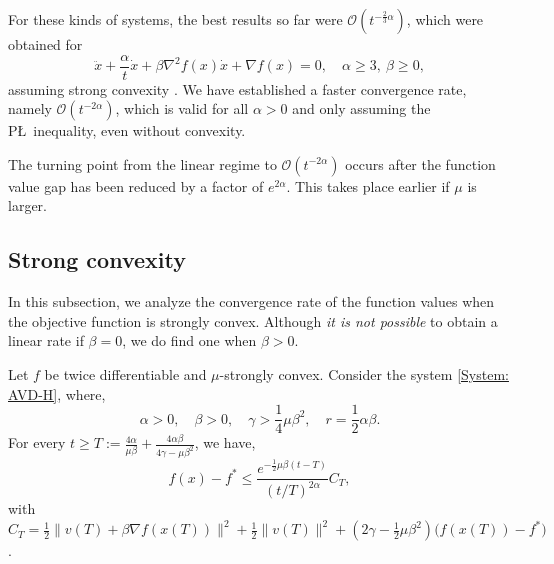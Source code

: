 \documentclass[onefignum,onetabnum]{siamart220329}
\begin{document}
\begin{remark}
For these kinds of systems, the best results so far were $\mathcal{O}\left( t^{-\frac{2}{3}\alpha} \right)$, which were obtained for 
$$ \ddot{x} + \frac{\alpha}{t}\dot{x} + \beta\nabla^2 f(x)\dot{x} + \nabla f(x) = 0,\quad\alpha\ge 3,\ \beta\ge  0,$$
assuming strong convexity \cite{Su_2016,Attouch_2016_Hessian,Attouch_2018}. We have established a faster convergence rate, namely $\mathcal{O}\left( t^{-2\alpha} \right)$, which is valid for all $\alpha>0$ and only assuming the P\L\ inequality, even without convexity.
\end{remark}


\begin{remark}
The turning point from the linear regime to $\mathcal{O}\left( t^{-2\alpha} \right)$ occurs after the function value gap has been reduced by a factor of $e^{2\alpha}$. This takes place earlier if $\mu$ is larger.
\end{remark}




\subsection{Strong convexity}
In this subsection, we analyze the convergence rate of the function values when the objective function is strongly convex. Although {\it it is not possible} \cite{Su_2016} to obtain a linear rate if $\beta=0$, we do find one when $\beta>0$. 

\begin{theorem}
Let $f$ be twice differentiable and $\mu$-strongly convex. Consider the system \eqref{System: AVD-H}, where, 
$$ \alpha > 0,\quad \beta > 0,\quad \gamma>\frac{1}{4}\mu\beta^2,\quad r= \frac{1}{2}\alpha\beta. $$
For every $t\ge T:=\frac{4\alpha}{\mu\beta} + \frac{4\alpha\beta}{4\gamma-\mu\beta^2}$, we have, 
$$ f(x) - f^* \le \frac{e^{-\frac{1}{2}\mu\beta (t-T)}}{\left( t/T \right)^{2\alpha}} C_T, $$
with $C_T = \frac{1}{2}\| v(T) + \beta\nabla f(x(T)) \|^2 + \frac{1}{2}\| v(T) \|^2 + \left(2\gamma-\frac{1}{2}\mu\beta^2\right)\big( f(x(T)) - f^* \big)$.
\end{theorem}
\end{document}
